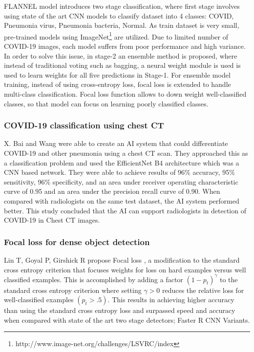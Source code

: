 \documentclass{sigkddExp}
\begin{document}
FLANNEL model introduces two stage classification, where first stage involves
using state of the art CNN models to classify dataset into 4 classes: COVID,
Pneumonia virus, Pneumonia bacteria, Normal. As train dataset is very small,
pre-trained models using
ImageNet\footnote{http://www.image-net.org/challenges/LSVRC/index} are utilized.
Due to limited number of COVID-19 images, each model suffers from poor
performance and high variance. In order to solve this issue, in stage-2 an
ensemble method is proposed, where instead of traditional voting such as
bagging\cite{combine}, a neural weight module is used is used to learn weights
for all five predictions in Stage-1. For ensemble model training, instead of
using cross-entropy loss, focal loss \cite{lin2018focal} is extended to handle
multi-class classification. Focal loss function allows to down weight
well-classified classes, so that model can focus on learning poorly classified
classes.


\subsubsection{COVID-19 classification using chest CT}

X. Bai and Wang \cite{pmid32339081} were able to create an AI system that could
differentiate COVID-19 and other pneumonia using a chest CT scan. They
approached this as a classification problem and used the EfficientNet B4
architecture which was a CNN based network. They were able to achieve results of
96\% accuracy, 95\% sensitivity, 96\% specificity, and an area under receiver
operating characteristic curve of 0.95 and an area under the precision recall
curve of 0.90. When compared with radiologists on the same test dataset, the AI
system performed better. This study concluded that the AI can support
radiologists in detection of COVID-19 in Chest CT images.

\subsubsection{Focal loss for dense object detection}

Lin T, Goyal P, Girshick R propose Focal loss \cite{lin2018focal}, a
modification to the standard cross entropy criterion that focuses weights for
loss on hard examples versus well classified examples. This is accomplished by
adding a factor $(1 - p_t)^\gamma$ to the standard cross entropy criterion where
setting $\gamma  > 0$ reduces the relative loss for well-classified examples
$(p_t > .5)$. This results in achieving higher accuracy than using the standard
cross entropy loss and surpassed speed and accuracy when compared with state of
the art two stage detectors; Faster R CNN Variants.
\end{document}
